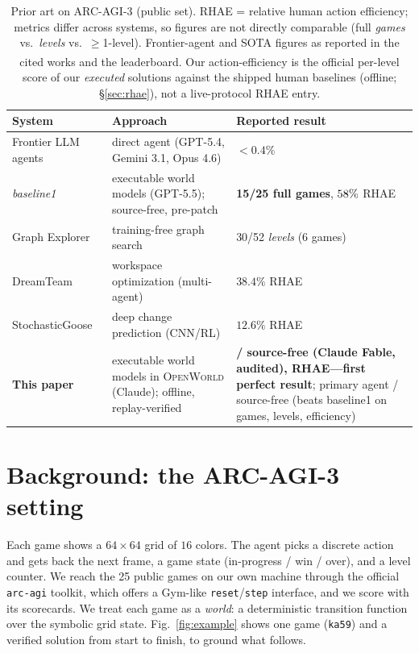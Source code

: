 \documentclass[11pt]{article}
\newcommand{\openworld}{\textsc{OpenWorld}}
\newcommand{\NumArcGames}{25}
\begin{document}
\begin{table}[t]
\centering\small
\caption{Prior art on ARC-AGI-3 (public set). RHAE = relative human action efficiency; metrics differ
across systems, so figures are not directly comparable (full \emph{games} vs.\ \emph{levels} vs.\
$\geq$1-level). Frontier-agent and SOTA figures as reported in the cited works and the leaderboard.
\textsuperscript{\dag}Our action-efficiency is the official per-level score of our \emph{executed}
solutions against the shipped human baselines (offline; \S\ref{sec:rhae}), not a live-protocol RHAE
entry.}
\label{tab:priorart}
\begin{tabular}{@{}L{3.2cm}L{6.0cm}L{5.1cm}@{}}
\toprule
System & Approach & Reported result \\
\midrule
Frontier LLM agents & direct agent (GPT-5.4, Gemini 3.1, Opus 4.6) & $<0.4\%$~\cite{arcagi3_report} \\
\emph{baseline1}~\cite{baseline1_ewm} & executable world models (GPT-5.5); source-free, pre-patch & \textbf{15/25 full games}, $58\%$ RHAE \\
Graph Explorer~\cite{graphexplore_arc3} & training-free graph search & 30/52 \emph{levels} (6 games) \\
DreamTeam~\cite{dreamteam_workspace} & workspace optimization (multi-agent) & $38.4\%$ RHAE \\
StochasticGoose~\cite{stochasticgoose} & deep change prediction (CNN/RL) & $12.6\%$ RHAE \\
\midrule
\textbf{This paper} & executable world models in \openworld{} (Claude); offline, replay-verified & \textbf{\ArcFableFull/\ArcUnionGames{} source-free (Claude Fable, audited), \ArcFableRhae{} RHAE---first perfect result}; primary agent \ArcSFGames/\ArcUnionGames{} source-free (beats baseline1 on games, levels, efficiency) \\
\bottomrule
\end{tabular}
\end{table}

\section{Background: the ARC-AGI-3 setting}
\label{sec:setting}

Each game shows a $64\times64$ grid of $16$ colors. The agent picks a discrete action and gets
back the next frame, a game state (in-progress / win / over), and a level counter. We reach
the \NumArcGames{} public games on our own machine through the official \texttt{arc-agi} toolkit,
which offers a Gym-like \texttt{reset}/\texttt{step} interface, and we score with its scorecards. We treat each
game as a \emph{world}: a deterministic transition function over the symbolic grid state.
Fig.~\ref{fig:example} shows one game (\texttt{ka59}) and a verified solution from start to finish, to ground
what follows.
\end{document}
